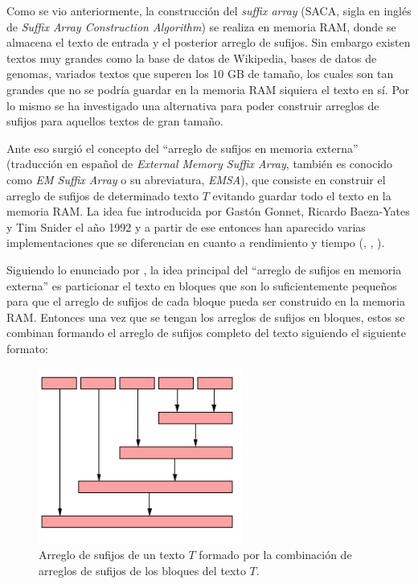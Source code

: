 Como se vio anteriormente, la construcción del \textit{suffix array} (SACA, sigla en inglés de \textit{Suffix Array Construction Algorithm}) se realiza en memoria RAM, donde se almacena el texto de entrada y el posterior arreglo de sufijos. Sin embargo existen textos muy grandes como la base de datos de Wikipedia, bases de datos de genomas, variados textos que superen los 10 GB de tamaño, los cuales son tan grandes que no se podría guardar en la memoria RAM siquiera el texto en sí. Por lo mismo se ha investigado una alternativa para poder construir arreglos de sufijos para aquellos textos de gran tamaño.

Ante eso surgió el concepto del ``arreglo de sufijos en memoria externa'' (traducción en español de \textit{External Memory Suffix Array}, también es conocido como \textit{EM Suffix Array} o su abreviatura, \textit{EMSA}), que consiste en construir el arreglo de sufijos de determinado texto $T$ evitando guardar todo el texto en la memoria RAM. La idea fue introducida por Gastón Gonnet, Ricardo Baeza-Yates y Tim Snider el año 1992 \cite{newindices} y a partir de ese entonces han aparecido varias implementaciones que se diferencian en cuanto a rendimiento y tiempo (\cite{better}, \cite{esais}, \cite{sascan}).

Siguiendo lo enunciado por \cite{sascan}, la idea principal del ``arreglo de sufijos en memoria externa'' es particionar el texto en bloques que son lo suficientemente pequeños para que el arreglo de sufijos de cada bloque pueda ser construido en la memoria RAM. Entonces una vez que se tengan los arreglos de sufijos en bloques, estos se combinan formando el arreglo de sufijos completo del texto siguiendo el siguiente formato: 

\newpage

\begin{figure}[h]
    \centering
    \includegraphics[width=0.6\textwidth]{./images/combinacionsascan.png}
    \caption{Arreglo de sufijos de un texto $T$ formado por la combinación de arreglos de sufijos de los bloques del texto $T$. }
    \label{fig:comb1}
\end{figure}

